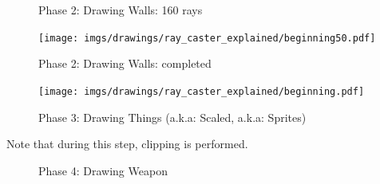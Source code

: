  
\begin{figure}[H]
 \centering
 \caption{Phase 2: Drawing Walls: 160 rays}  
\end{figure}
 \begin{minipage}{.4\textwidth}
 \end{minipage}
\begin{minipage}{.6\textwidth}
\begin{figure}[H]
  \begin{flushright}
 \texttt{[image: imgs/drawings/ray\_caster\_explained/beginning50.pdf]}
   \end{flushright}
\end{figure}
\end{minipage}



 
 \begin{figure}[H]
\centering
 \caption{Phase 2: Drawing Walls: completed} 
 \end{figure}
\begin{minipage}{.4\textwidth}
 \end{minipage}
\begin{minipage}{.6\textwidth}
\begin{figure}[H]
  \begin{flushright}
 \texttt{[image: imgs/drawings/ray\_caster\_explained/beginning.pdf]}
   \end{flushright}
\end{figure}
\end{minipage}




 
 
 \begin{figure}[H]
\centering
 \caption{Phase 3: Drawing Things (a.k.a: Scaled, a.k.a: Sprites)} 
 \end{figure}
Note that during this step, clipping is performed.




 \begin{figure}[H]
\centering
 \caption{Phase 4: Drawing Weapon} 
 \end{figure}
 













